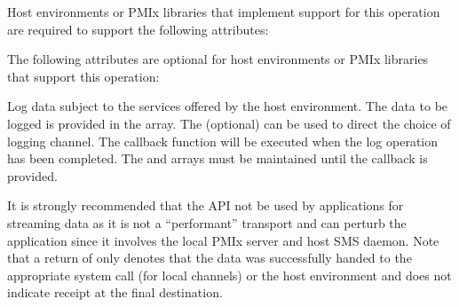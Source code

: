 
Host environments or \ac{PMIx} libraries that implement support for this operation are required to support the following attributes:


\reqattrend

\optattrstart
The following attributes are optional for host environments or \ac{PMIx} libraries that support this operation:


\optattrend

\descr

Log data subject to the services offered by the host environment. The data to be logged is provided in the  array. The (optional)  can be used to direct the choice of logging channel.
The callback function will be executed when the log operation has been completed. The  and  arrays must be maintained until the callback is provided.

\adviceuserstart
It is strongly recommended that the  API not be used by applications for streaming data as it is not a ``performant'' transport and can perturb the application since it involves the local \ac{PMIx} server and host \ac{SMS} daemon. Note that a return of  only denotes that the data was successfully handed to the appropriate system call (for local channels) or the host environment and does not indicate receipt at the final destination.
\adviceuserend


